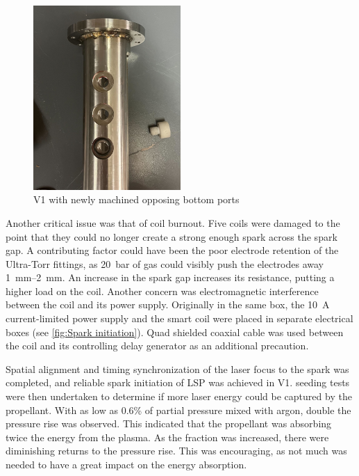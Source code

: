 \begin{figure}[!ht]
    \centering
    \includegraphics[width=0.5\textwidth]{assets/5 discussion/Bottom ports machined.jpg}
    \caption{V1 with newly machined opposing bottom ports}
    \label{fig: V1 opposing ports}
\end{figure}

Another critical issue was that of coil burnout. Five coils were damaged to the point that they could no longer create a strong enough spark across the spark gap. A contributing factor could have been the poor electrode retention of the Ultra-Torr fittings, as \qty{20}{bar} of gas could visibly push the electrodes away \qtyrange{1}{2}{mm}. An increase in the spark gap increases its resistance, putting a higher load on the coil. Another concern was electromagnetic interference between the coil and its power supply. Originally in the same box, the \qty{10}{A} current-limited power supply and the smart coil were placed in separate electrical boxes (see \autoref{fig:Spark initiation}). Quad shielded coaxial cable was used between the coil and its controlling delay generator as an additional precaution. 

Spatial alignment and timing synchronization of the laser focus to the spark was completed, and reliable spark initiation of LSP was achieved in V1.  seeding tests were then undertaken to determine if more laser energy could be captured by the propellant. With as low as 0.6\% of  partial pressure mixed with argon, double the pressure rise was observed. This indicated that the propellant was absorbing twice the energy from the plasma. As the  fraction was increased, there were diminishing returns to the pressure rise. This was encouraging, as not much  was needed to have a great impact on the energy absorption.

